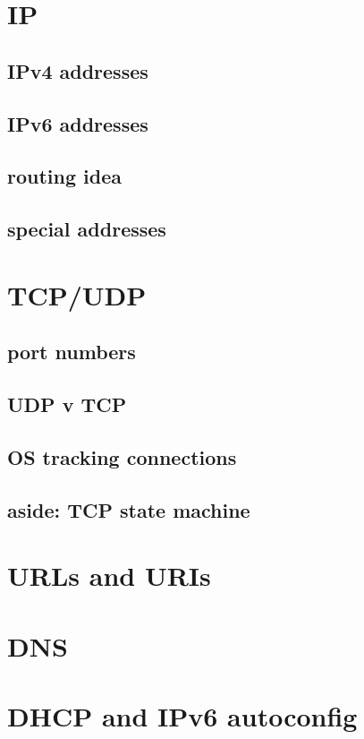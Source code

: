 

\section{IP}


\subsection{IPv4 addresses}


\subsection{IPv6 addresses}


\subsection{routing idea}


\subsection{special addresses}


\section{TCP/UDP}

\subsection{port numbers}


\subsection{UDP v TCP}


\subsection{OS tracking connections}


\subsection{aside: TCP state machine}


\section{URLs and URIs}



\section{DNS}


\section{DHCP and IPv6 autoconfig}


